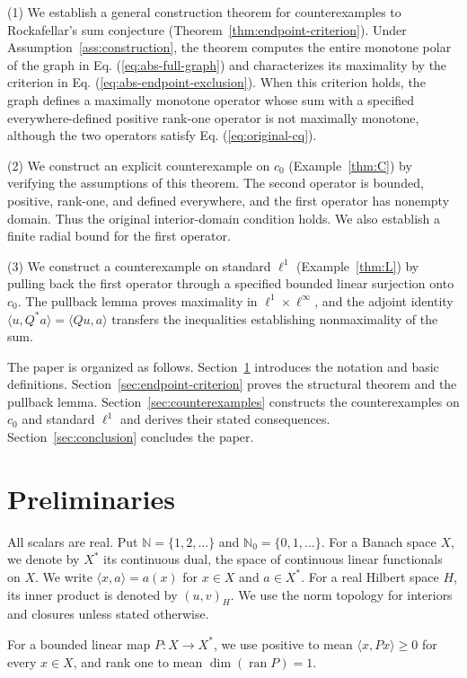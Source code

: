 \documentclass[11pt]{article}
\newcommand{\N}{\mathbb N}
\newcommand{\Nzero}{\mathbb N_0}
\newcommand{\pair}[2]{\langle #1,#2\rangle}
\theoremstyle{definition}
\theoremstyle{remark}
\begin{document}
(1) We establish a general construction theorem for counterexamples to Rockafellar's sum conjecture (Theorem~\ref{thm:endpoint-criterion}). Under Assumption~\ref{ass:construction}, the theorem computes the entire monotone polar of the graph in Eq. (\ref{eq:abs-full-graph}) and characterizes its maximality by the criterion in Eq. (\ref{eq:abs-endpoint-exclusion}). When this criterion holds, the graph defines a maximally monotone operator whose sum with a specified everywhere-defined positive rank-one operator is not maximally monotone, although the two operators satisfy Eq. (\ref{eq:original-cq}).

(2) We construct an explicit counterexample on $c_0$ (Example~\ref{thm:C}) by verifying the assumptions of this theorem. The second operator is bounded, positive, rank-one, and defined everywhere, and the first operator has nonempty domain. Thus the original interior-domain condition holds. We also establish a finite radial bound for the first operator.

(3) We construct a counterexample on standard $\ell^1$ (Example~\ref{thm:L}) by pulling back the first operator through a specified bounded linear surjection onto $c_0$. The pullback lemma proves maximality in $\ell^1\times\ell^\infty$, and the adjoint identity $\pair{u}{Q^*a}=\pair{Qu}{a}$ transfers the inequalities establishing nonmaximality of the sum.

The paper is organized as follows. Section~\ref{sec:definitions} introduces the notation and basic definitions. Section~\ref{sec:endpoint-criterion} proves the structural theorem and the pullback lemma. Section~\ref{sec:counterexamples} constructs the counterexamples on $c_0$ and standard $\ell^1$ and derives their stated consequences. Section~\ref{sec:conclusion} concludes the paper.


\section{Preliminaries}
\label{sec:definitions}
All scalars are real. Put $\N=\{1,2,\ldots\}$ and $\Nzero=\{0,1,\ldots\}$. For a Banach space $X$, we denote by $X^*$ its continuous dual, the space of continuous linear functionals on $X$. We write $\pair{x}{a}=a(x)$ for $x\in X$ and $a\in X^*$. For a real Hilbert space $H$, its inner product is denoted by $(u,v)_H$. We use the norm topology for interiors and closures unless stated otherwise.

For a bounded linear map $P:X\to X^*$, we use positive to mean $\pair{x}{Px}\ge0$ for every $x\in X$, and rank one to mean $\dim(\operatorname{ran}P)=1$.
\end{document}
